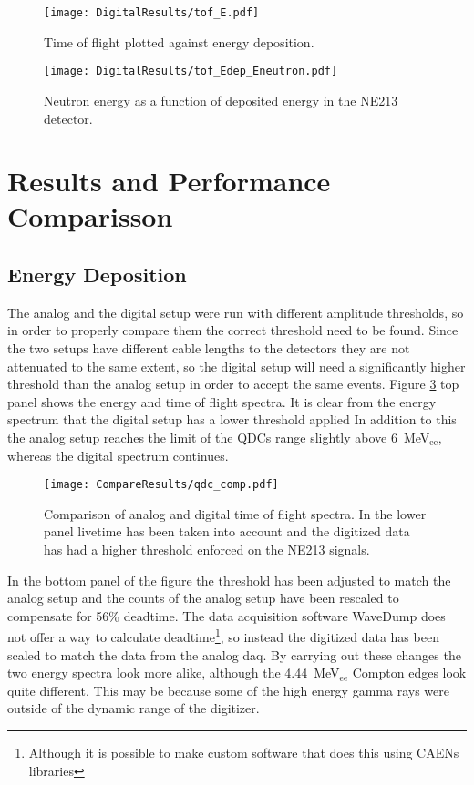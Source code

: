 \documentclass[main.tex]{subfiles}
\begin{document}
\begin{figure}[ht]
    \centering
        \texttt{[image: DigitalResults/tof\_E.pdf]}
        \caption{Time of flight plotted against energy deposition.}
    \label{fig:tof_E_d} 
\end{figure}

\begin{figure}[ht]
    \centering
        \texttt{[image: DigitalResults/tof\_Edep\_Eneutron.pdf]}
        \caption{Neutron energy as a function of deposited energy in the NE213 detector.}
    \label{fig:tof_Edep_Eneutron_d} 
\end{figure}







\section{Results and Performance Comparisson}\label{sec:results}
\subsection{Energy Deposition}

The analog and the digital setup were run with different amplitude thresholds, so in order to properly compare them the correct threshold need to be found. Since the two setups have different cable lengths to the detectors they are not attenuated to the same extent, so the digital setup will need a significantly higher threshold than the analog setup in order to accept the same events. Figure \ref{fig:qdc_comp} top panel shows the energy and time of flight spectra. It is clear from the energy spectrum that the digital setup has a lower threshold applied In addition to this the analog setup reaches the limit of the QDCs range slightly above \SI{6}{\MeV}$_\text{ee}$, whereas the digital spectrum continues. 

\begin{figure}[h]
    \centering
        \texttt{[image: CompareResults/qdc\_comp.pdf]}
        \caption{Comparison of analog and digital time of flight spectra. In the lower panel livetime has been taken into account and the digitized data has had a higher threshold enforced on the NE213 signals.}
    \label{fig:qdc_comp}
\end{figure}

In the bottom panel of the figure the threshold has been adjusted to match the analog setup and the counts of the analog setup have been rescaled to compensate for 56\% deadtime. The data acquisition software WaveDump does not offer a way to calculate deadtime\footnote{Although it is possible to make custom software that does this using CAENs libraries}, so instead the digitized data has been scaled to match the data from the analog daq. By carrying out these changes the two energy spectra look more alike, although the \SI{4.44}{\MeV}$_\text{ee}$ Compton edges look quite different. This may be because some of the high energy gamma rays were outside of the dynamic range of the digitizer.
\end{document}
